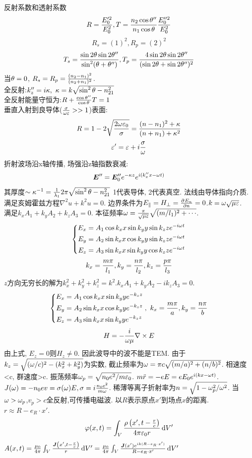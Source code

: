 \documentclass[UTF8,8pt]{ctexart}
\begin{document}
\begin{multicols}{3}
    反射系数和透射系数
    $$R=\frac{E_0'^2}{E_0^2}, T=\frac{n_2\cos\theta''}{n_1\cos\theta}\frac{E_0''^2}{E_0^2}$$
    $$R_s=(1)^2,R_p=(2)^2$$
    $$T_s=\frac{\sin2\theta\sin2\theta''}{\sin^2(\theta+\theta'')},T_p=\frac{4\sin2\theta\sin2\theta''}{(\sin2\theta+\sin2\theta'')^2}$$
    当$\theta=0$, $R_s=R_p=\frac{(n_2-n_1)^2}{(n_2+n_1)^2}$. \\
    全反射:$k_z''=i\kappa,\ \kappa=k\sqrt{\sin^2\t-n_{21}^2}$\\
    全反射能量守恒为:$R+\frac{\cos\theta''}{\cos\theta}T=1$\\
    垂直入射到良导体($\frac{\sigma}{\omega\varepsilon}>>1$)表面:
    $$R=1-2\sqrt{\frac{2\omega\varepsilon_0}{\sigma}}=\frac{(n-n_1)^2+\kappa}{(n+n_1)+\kappa^2}$$
    $$\varepsilon'=\varepsilon+i\frac{\sigma}{\omega}$$
    折射波场沿x轴传播, 场强沿z轴指数衰减:
    $$\bm{E}''=\bm{E}''_0e^{-\kappa z}e^{i(k''_xx-\omega t)}$$
    其厚度$\sim\kappa^{-1}=\frac{1}{\lambda_1}{2\pi\sqrt{\sin^2\theta-n_{21}^2}}$
    1代表导体, 2代表真空. 法线由导体指向介质. 满足亥姆霍兹方程$\nabla^2u+k^2u=0$. 边界条件为$E_\parallel=H_\perp=\frac{\partial^{} E_n}{\partial {n}^{}}=0$.$k=\omega\sqrt{\mu\varepsilon}$. \\
    满足$k_xA_1+k_yA_2+k_zA_3=0$. 本征频率$\omega=\frac{\pi}{\sqrt{\mu\varepsilon}}\sqrt{(m/l_1)^2+\cdots}$. 
    $$\left\{\begin{aligned} 
        E_x &= A_1\cos k_xx \sin k_y y \sin k_zze^{-i\omega t}\\
        E_y &= A_2\sin k_xx \cos k_y y \sin k_zze^{-i\omega t}\\
        E_z &= A_3\sin k_xx \sin k_y y \cos k_zze^{-i\omega t}
     \end{aligned}\right.$$
    $$k_x=\frac{m\pi}{l_1},k_y=\frac{n\pi}{l_2},k_z=\frac{p\pi}{l_3}$$
    $z$方向无穷长的解为$k_x^2+k_y^2+k_z^2=k^2$.$k_xA_1+k_yA_2-ik_zA_3=0$. 
    $$\left\{\begin{aligned} 
        E_x &= A_1\cos k_xx \sin k_y y e^{-k_zz}\\
        E_y &= A_2\sin k_xx \cos k_y y e^{-k_zz}\\
        E_z &= A_3\sin k_xx \sin k_y y e^{-k_zz}
     \end{aligned}\right.,\ k_x=\frac{m\pi}{a},k_y=\frac{n\pi}{b}$$
    $$H=-\frac{i}{\omega\mu}\nabla\times E$$
    由上式, $E_z=0$则$H_z\neq 0$. 因此波导中的波不能是TEM. 由于$k_z=\sqrt{(\omega/c)^2-(k_x^2+k_y^2)}$为实数, 截止频率为$\omega=\pi c\sqrt{(m/a)^2+(n/b)^2}$. 相速度<c, 群速度>c.
    振荡频率$\omega_p=\sqrt{n_0e^2/m\varepsilon_0}$. $m\ddot{r}=-eE=eE_0e^{i(kx-\omega t)}$. $J(\omega)=-n_0ev=\sigma(\omega)E,\sigma=i\frac{n_0e^2}{m\omega}$. 稀薄等离子折射率为$n=\sqrt{1-\omega_p^2/\omega^2}$. 当$\omega>\omega_p$,$v_p>c$全反射,可传播电磁波. 
    以$R$表示原点$x'$到场点$x$的距离. $r\approx R-e_R\cdot x'$. 
    $$\varphi(x,t)=\int_V\frac{\rho\left( x',t-\frac{r}{c} \right)}{4\pi\varepsilon_0r}\mathop{}\!\mathrm{d} V'$$
    $A(x,t)=\frac{\mu_0}{4\pi}\int_V\frac{\bm{J}\left( x',t-\frac{r}{c} \right)}{r}\mathop{}\!\mathrm{d} V'=\frac{\mu_0}{4\pi}\int_V\frac{\bm{J}(x')e^{ik(R-e_R\cdot x')}}{R-e_R\cdot x'}\mathop{}\!\mathrm{d} V'$\\

\end{multicols}
\end{document}
